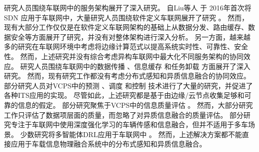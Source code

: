 研究人员围绕车联网中的服务架构展开了深入研究。
自Liu等人 \cite{liu2016cooperative} 于 2016年首次将 SDN 应用于车联网中，大量研究人员围绕软件定义车联网展开了研究 \cite{dai2018cooperative, luo2018sdnmac, liu2018coding, zhang2022ac-sdvn, zhao2022elite, lin2023alps, ahmed2023deep}。
然而，现有大部分工作仅仅是在软件定义车联网架构的基础上从数据分发、路由缓存、数据安全等方面展开了研究，并没有对整体架构进行深入分析。
另一方面，越来越多的研究在车联网环境中考虑将边缘计算范式以提高系统实时性、可靠性、安全性\cite{liu2017a, lang2022cooperative, liu2021fog, dai2021edge, zhang2022digital, liu2020adaptive, liao2021learning, liu2023mobility, liu2023asynchronous}。
然而，上述研究并没有综合考虑异构车联网中最大化不同服务架构的协同效应。
研究人员围绕车联网中的数据传播 \cite{liu2021fog, singh2020intent}、信息缓存 \cite{zhang2022digital, dai2020deep, su2018an} 和任务卸载 \cite{shang2021deep, liao2021learning} 方面展开了深入研究。
然而，现有研究工作都没有考虑分布式感知和异质信息融合的协同效应。
部分研究人员对VCPS中的预测 \cite{zhang2019a, zhang2020data}、调度 \cite{li2020cyber, lian2021cyber} 和控制 \cite{dai2016a, hu2017cyber, lv2018driving} 技术进行了大量的研究，并促进了各种ITS应用的实现。
尽管如此，上述研究都是基于由边缘/云节点收集足够和可靠的信息的假定。
部分研究聚焦于VCPS中的信息质量评估 \cite{liu2014temporal, dai2019temporal, liu2014scheduling, rager2017scalability, yoon2021performance}。
然而，大部分研究工作只评估了数据项层面的质量，而忽略了对异质信息融合的质量评估。
部分研究专注于车联网中使用深度强化学习的车辆传感和信息融合，但并不适用于多车场景。
少数研究将多智能体DRL应用于车联网中 \cite{kumar2022multi, he2021efficient}。
然而，上述解决方案都不能直接应用于车载信息物理融合系统中的分布式感知和异质信息融合。

